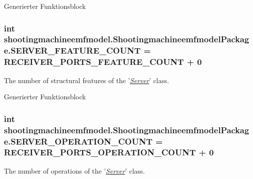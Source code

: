Generierter Funktionsblock  \hypertarget{interfaceshootingmachineemfmodel_1_1_shootingmachineemfmodel_package_a162737c771f292144dd9794302b3ac64}{
\subsubsection[{S\-E\-R\-V\-E\-R\-\_\-\-F\-E\-A\-T\-U\-R\-E\-\_\-\-C\-O\-U\-N\-T}]{\setlength{\rightskip}{0pt plus 5cm}int shootingmachineemfmodel.\-Shootingmachineemfmodel\-Package.\-S\-E\-R\-V\-E\-R\-\_\-\-F\-E\-A\-T\-U\-R\-E\-\_\-\-C\-O\-U\-N\-T = {\bf R\-E\-C\-E\-I\-V\-E\-R\-\_\-\-P\-O\-R\-T\-S\-\_\-\-F\-E\-A\-T\-U\-R\-E\-\_\-\-C\-O\-U\-N\-T} + 0}}\label{interfaceshootingmachineemfmodel_1_1_shootingmachineemfmodel_package_a162737c771f292144dd9794302b3ac64}
The number of structural features of the '{\itshape \hyperlink{interfaceshootingmachineemfmodel_1_1_server}{Server}}' class.

Generierter Funktionsblock  \hypertarget{interfaceshootingmachineemfmodel_1_1_shootingmachineemfmodel_package_a2099b192ce21fd280f2a1cf282c646be}{
\subsubsection[{S\-E\-R\-V\-E\-R\-\_\-\-O\-P\-E\-R\-A\-T\-I\-O\-N\-\_\-\-C\-O\-U\-N\-T}]{\setlength{\rightskip}{0pt plus 5cm}int shootingmachineemfmodel.\-Shootingmachineemfmodel\-Package.\-S\-E\-R\-V\-E\-R\-\_\-\-O\-P\-E\-R\-A\-T\-I\-O\-N\-\_\-\-C\-O\-U\-N\-T = {\bf R\-E\-C\-E\-I\-V\-E\-R\-\_\-\-P\-O\-R\-T\-S\-\_\-\-O\-P\-E\-R\-A\-T\-I\-O\-N\-\_\-\-C\-O\-U\-N\-T} + 0}}\label{interfaceshootingmachineemfmodel_1_1_shootingmachineemfmodel_package_a2099b192ce21fd280f2a1cf282c646be}
The number of operations of the '{\itshape \hyperlink{interfaceshootingmachineemfmodel_1_1_server}{Server}}' class.

